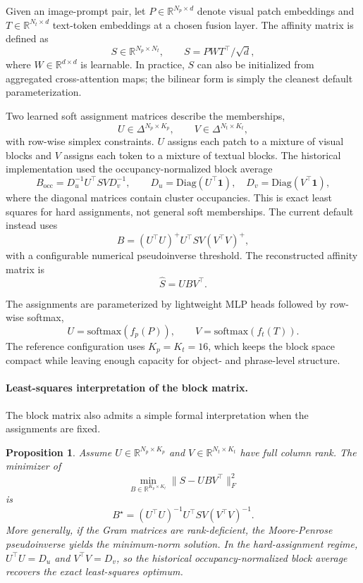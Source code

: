 \documentclass[11pt,a4paper]{article}
\newcommand{\R}{\mathbb{R}}
\newcommand{\Diag}{\mathrm{Diag}}
\newcommand{\softmax}{\mathrm{softmax}}
\newtheorem{proposition}{Proposition}
\begin{document}
Given an image-prompt pair, let $P \in \R^{N_p \times d}$ denote visual patch embeddings and $T \in \R^{N_t \times d}$ text-token embeddings at a chosen fusion layer. The affinity matrix is defined as
\[
S \in \R^{N_p \times N_t}, \qquad S = PWT^{\top}/\sqrt{d},
\]
where $W \in \R^{d \times d}$ is learnable. In practice, $S$ can also be initialized from aggregated cross-attention maps; the bilinear form is simply the cleanest default parameterization.

Two learned soft assignment matrices describe the memberships,
\[
U \in \Delta^{N_p \times K_p}, \qquad V \in \Delta^{N_t \times K_t},
\]
with row-wise simplex constraints. $U$ assigns each patch to a mixture of visual blocks and $V$ assigns each token to a mixture of textual blocks. The historical implementation used the occupancy-normalized block average
\[
B_{\mathrm{occ}} = D_u^{-1}U^{\top}SV D_v^{-1},
\qquad
D_u = \Diag(U^{\top}\mathbf{1}), \quad D_v = \Diag(V^{\top}\mathbf{1}),
\]
where the diagonal matrices contain cluster occupancies. This is exact least squares for hard assignments, not general soft memberships. The current default instead uses
\[
B=(U^\top U)^+U^\top SV(V^\top V)^+,
\]
with a configurable numerical pseudoinverse threshold. The reconstructed affinity matrix is
\[
\hat{S} = UBV^{\top}.
\]

The assignments are parameterized by lightweight MLP heads followed by row-wise softmax,
\[
U = \softmax(f_p(P)), \qquad V = \softmax(f_t(T)).
\]
The reference configuration uses $K_p=K_t=16$, which keeps the block space compact while leaving enough capacity for object- and phrase-level structure.

\paragraph{Least-squares interpretation of the block matrix.}
The block matrix also admits a simple formal interpretation when the assignments are fixed.
\begin{proposition}
\label{prop:ls-block}
Assume $U \in \R^{N_p \times K_p}$ and $V \in \R^{N_t \times K_t}$ have full column rank. The minimizer of
\[
\min_{B \in \R^{K_p \times K_t}} \|S - U B V^{\top}\|_F^2
\]
is
\[
B^{\star} = (U^{\top}U)^{-1}U^{\top}SV(V^{\top}V)^{-1}.
\]
More generally, if the Gram matrices are rank-deficient, the Moore-Penrose pseudoinverse yields the minimum-norm solution. In the hard-assignment regime, $U^{\top}U = D_u$ and $V^{\top}V = D_v$, so the historical occupancy-normalized block average recovers the exact least-squares optimum.
\end{proposition}
\end{document}
